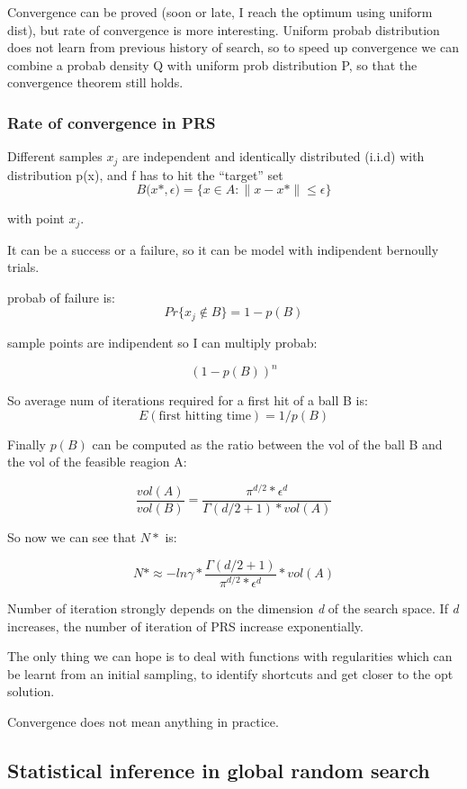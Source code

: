 \documentclass[10pt]{article}
\begin{document}
Convergence can be proved (soon or late, I reach the optimum using uniform dist), but rate of convergence is more interesting. Uniform probab distribution does not learn from previous history of search, so to speed up convergence we can combine a probab density Q with uniform prob distribution P, so that the convergence theorem still holds.

\subsubsection{Rate of convergence in PRS}
Different samples $ x_{j} $ are independent and identically distributed (i.i.d) with distribution p(x), and f has to hit the “target” set 
$$ 
B \big(x\ast , \epsilon \big) = \{ x \in A : \parallel x - x\ast \parallel \le \epsilon \}
$$

with point $ x_{j} $.

It can be a success or a failure, so it can be model with indipendent bernoully trials.

probab of failure is:
$$
Pr \{ x_j \notin B \} = 1-p(B)
$$

sample points are indipendent so I can multiply probab:

$$
(1-p(B))^n
$$

So average num of iterations required for a first hit of a ball B is:
$$
E(\text{first hitting time}) = 1 / p(B)
$$

Finally $ p(B) $ can be computed as the ratio between the vol of the ball B and the vol of the feasible reagion A:

$$ 
\frac{vol(A)}{vol(B)} = \frac{\pi^{d/2}*\epsilon^d}{\Gamma(d/2+1)*vol(A)}
$$

So now we can see that $ N\ast $ is:

$$
N\ast \approx -ln{\gamma} * \frac{\Gamma(d/2+1)}{\pi^{d/2}*\epsilon^{d}}*vol(A)
$$

Number of iteration strongly depends on the dimension \textit{d} of the search space. If \textit{d} increases, the number of iteration of PRS increase exponentially. 

The only thing we can hope is to deal with functions with regularities which can be learnt from an initial sampling, to identify shortcuts and get closer to the opt solution. 

Convergence does not mean anything in practice.

\subsection{Statistical inference in global random search}
\end{document}
